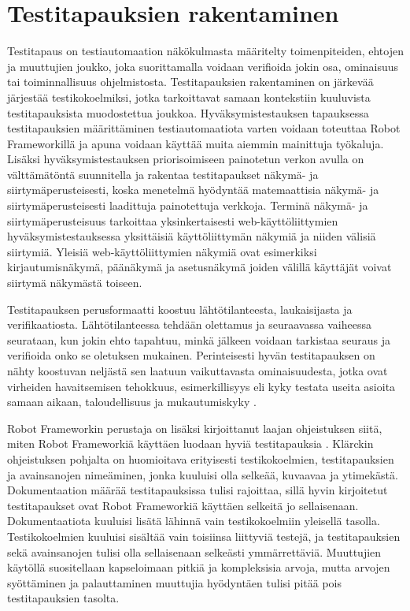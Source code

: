 \section{Testitapauksien rakentaminen} \label{ch:08_testitapauksien_rakentaminen}

  Testitapaus on testiautomaation näkökulmasta määritelty toimenpiteiden, ehtojen ja muuttujien joukko, joka suorittamalla voidaan verifioida jokin osa, ominaisuus tai toiminnallisuus ohjelmistosta.
  Testitapauksien rakentaminen on järkevää järjestää testikokoelmiksi, jotka tarkoittavat samaan kontekstiin kuuluvista testitapauksista muodostettua joukkoa.
  Hyväksymistestauksen tapauksessa testitapauksien määrittäminen testiautomaatiota varten voidaan toteuttaa Robot Frameworkillä \cite{robot_framework_book} ja apuna voidaan käyttää muita aiemmin mainittuja työkaluja.
  Lisäksi hyväksymistestauksen priorisoimiseen painotetun verkon avulla on välttämätöntä suunnitella ja rakentaa testitapaukset näkymä- ja siirtymäperusteisesti, koska menetelmä hyödyntää matemaattisia näkymä- ja siirtymäperusteisesti laadittuja painotettuja verkkoja.
  Terminä näkymä- ja siirtymäperusteisuus tarkoittaa yksinkertaisesti web-käyttöliittymien hyväksymistestauksessa yksittäisiä käyttöliittymän näkymiä ja niiden välisiä siirtymiä.
  Yleisiä web-käyttöliittymien näkymiä ovat esimerkiksi kirjautumisnäkymä, päänäkymä ja asetusnäkymä joiden välillä käyttäjät voivat siirtymä näkymästä toiseen.

  Testitapauksen perusformaatti koostuu lähtötilanteesta, laukaisijasta ja verifikaatiosta.
  Lähtötilanteessa tehdään olettamus ja seuraavassa vaiheessa seurataan, kun jokin ehto tapahtuu, minkä jälkeen voidaan tarkistaa seuraus ja verifioida onko se oletuksen mukainen.
  Perinteisesti hyvän testitapauksen on nähty koostuvan neljästä sen laatuun vaikuttavasta ominaisuudesta, jotka ovat virheiden havaitsemisen tehokkuus, esimerkillisyys eli kyky testata useita asioita samaan aikaan, taloudellisuus ja mukautumiskyky \cite[s.~4]{software_test_automation_book}.

  Robot Frameworkin perustaja on lisäksi kirjoittanut laajan ohjeistuksen siitä, miten Robot Frameworkiä käyttäen luodaan hyviä testitapauksia \cite{robot_framework_good_test_cases}.
  Klärckin ohjeistuksen pohjalta on huomioitava erityisesti testikokoelmien, testitapauksien ja avainsanojen nimeäminen, jonka kuuluisi olla selkeää, kuvaavaa ja ytimekästä.
  Dokumentaation määrää testitapauksissa tulisi rajoittaa, sillä hyvin kirjoitetut testitapaukset ovat Robot Frameworkiä käyttäen selkeitä jo sellaisenaan.
  Dokumentaatiota kuuluisi lisätä lähinnä vain testikokoelmiin yleisellä tasolla.
  Testikokoelmien kuuluisi sisältää vain toisiinsa liittyviä testejä, ja testitapauksien sekä avainsanojen tulisi olla sellaisenaan selkeästi ymmärrettäviä.
  Muuttujien käytöllä suositellaan kapseloimaan pitkiä ja kompleksisia arvoja, mutta arvojen syöttäminen ja palauttaminen muuttujia hyödyntäen tulisi pitää pois testitapauksien tasolta.

